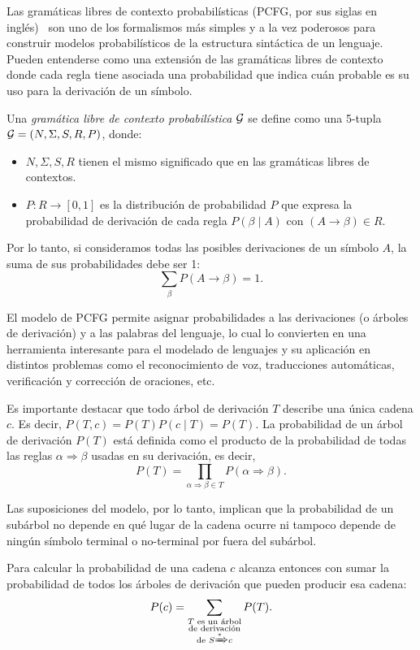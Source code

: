 Las gramáticas libres de contexto probabilísticas (PCFG, por sus siglas en inglés)~\cite{booth1969probabilistic} son uno de los formalismos más simples y a la vez poderosos para construir modelos probabilísticos de la estructura sintáctica de un lenguaje. Pueden entenderse como una extensión de las gramáticas libres de contexto donde cada regla tiene asociada una probabilidad que indica cuán probable es su uso para la derivación de un símbolo.

\begin{definicion}[PCFG]
Una {\em gramática libre de contexto probabilística} $\gram$ se define como una 5-tupla $\gram = (N, \Sigma, S, R, P)$, donde:
\begin{itemize}
    \item $N, \Sigma, S, R$ tienen el mismo significado que en las gramáticas libres de contextos.
    \item $P : R \to [0,1]$  es la distribución de probabilidad $P$ que expresa la probabilidad de derivación de cada regla $P(\beta \mid A)$ con $(A \to \beta) \in R$.
\end{itemize}
Por lo tanto, si consideramos todas las posibles derivaciones de un símbolo $A$, la suma de sus probabilidades debe ser 1:
$$
\sum_{\beta} P (A \to \beta) = 1.
$$
\end{definicion}
El modelo de PCFG permite asignar probabilidades a las derivaciones (o árboles de derivación) y a las palabras del lenguaje, lo cual lo convierten en una herramienta interesante para el modelado de lenguajes y su aplicación en distintos problemas como el reconocimiento de voz, traducciones automáticas, verificación y corrección de oraciones, etc.

Es importante destacar que todo árbol de derivación $T$ describe una única cadena $c$. Es decir, $P(T,c) = P(T) P(c\mid T) = P(T)$. La probabilidad de un árbol de derivación $P(T)$ está definida como el producto de la probabilidad de todas las reglas $\alpha \Rightarrow \beta$ usadas en su derivación, es decir,
$$
P(T) = \prod_{\alpha \Rightarrow \beta\in T} P(\alpha \Rightarrow \beta).
$$

Las suposiciones del modelo, por lo tanto, implican que la probabilidad de un subárbol no depende en qué lugar de la cadena ocurre ni tampoco depende de ningún símbolo terminal o no-terminal por fuera del subárbol.

Para calcular la probabilidad de una cadena $c$ alcanza entonces con sumar la probabilidad de todos los árboles de derivación que pueden producir esa cadena:
%
$$
P(c) = \sum_{\substack{T \text{ es un árbol}\\\text{de derivación} \\  \text{de } S \xRightarrow{\ast} c }}   P (T).
$$



